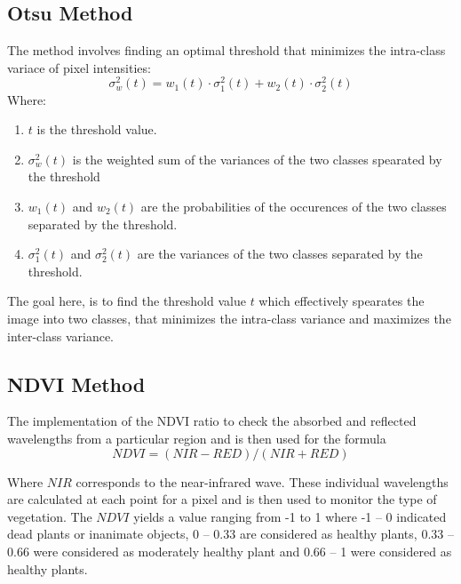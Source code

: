 \documentclass[12pt,a4paper,IEEEtran]{article}
\begin{document}
\subsection[4.2]{Otsu Method}
The method involves finding an optimal threshold that minimizes the intra-class variace of pixel intensities:
\begin{equation}
	\sigma^2_w(t) = w_1(t) \cdot \sigma_1^2(t) + w_2(t) \cdot \sigma_2^2(t)
\end{equation}
Where: 
\begin{enumerate}
	\item $t$ is the threshold value.
	\item $\sigma^2_w(t)$ is the weighted sum of the variances of the two classes spearated by the threshold
	\item $w_1(t)$ and $w_2(t)$ are the probabilities of the occurences of the two classes separated by the threshold.
	\item $\sigma_1^2(t)$ and $\sigma_2^2(t)$ are the variances of the two classes separated by the threshold.
\end{enumerate}
The goal here, is to find the threshold value $t$ which effectively spearates the image into two classes, that minimizes the intra-class variance and maximizes the inter-class variance. \cite{5254345}



\subsection[4.3]{NDVI Method}
The implementation of the NDVI ratio to check the absorbed and reflected wavelengths from a particular region and is then used for the formula  
\begin{equation}
	NDVI = (NIR - RED) / (NIR + RED)
\end{equation}

Where $NIR$ corresponds to the near-infrared wave. These individual wavelengths are calculated at each point for a pixel and is then used to monitor the type of vegetation. The $NDVI$ yields a value ranging from -1 to 1 where -1 – 0 indicated dead plants or inanimate objects, 0 – 0.33 are considered as healthy plants, 0.33 – 0.66 were considered as moderately healthy plant and 0.66 – 1 were considered as healthy plants.  
 
\end{document}

